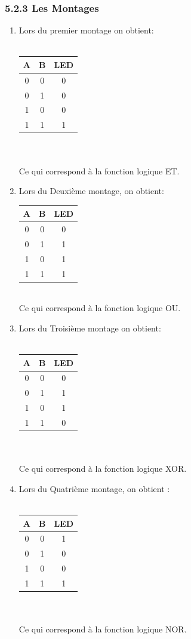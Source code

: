 \documentclass{report}
\begin{document}
\subsubsection*{5.2.3 Les Montages}
\begin{enumerate}
\item Lors du premier montage on obtient:\\
\\
\begin{tabular}{|c|c|c|}
\hline
A & B & LED \\
\hline
0&0&0\\
0&1&0\\
1&0&0\\
1&1&1\\
\hline
\end{tabular}\\
\\
Ce qui correspond \`a la fonction logique ET.\\
\newpage
\item Lors du Deuxi\`eme montage, on obtient:\\
\begin{tabular}{|c|c|c|}
\hline
A & B & LED \\
\hline
0&0&0\\
0&1&1\\
1&0&1\\
1&1&1\\
\hline
\end{tabular}\\
Ce qui correspond \`a la fonction logique OU.\\
\item Lors du Troisi\`eme montage on obtient:\\
\\
\begin{tabular}{|c|c|c|}
\hline
A & B & LED \\
\hline
0&0&0\\
0&1&1\\
1&0&1\\
1&1&0\\
\hline
\end{tabular}\\
\\
Ce qui correspond \`a la fonction logique XOR.
\item Lors du Quatrième montage, on obtient :\\
\\
\begin{tabular}{|c|c|c|}
\hline
A & B & LED \\
\hline
0&0&1\\
0&1&0\\
1&0&0\\
1&1&1\\
\hline
\end{tabular}\\
\\
Ce qui correspond \`a la fonction logique NOR.
\end{enumerate}
\end{document}

